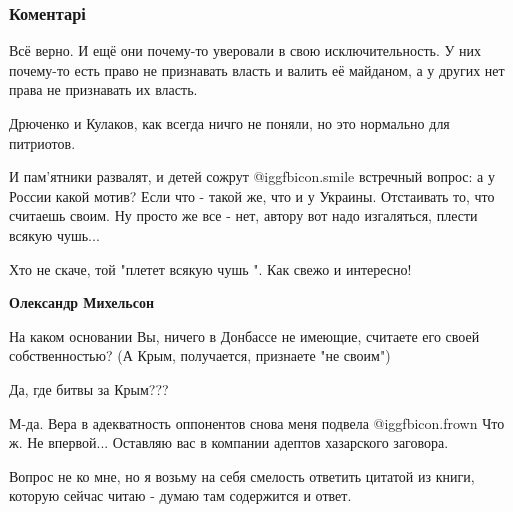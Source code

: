  
 
 
 
 
\subsubsection{Коментарі}
\label{sec:04_11_2021.fb.belenjkij_vjacheslav.1.patriotizm_vojna_donbass.cmt}

\begin{itemize} %

Всё верно. И ещё они почему-то уверовали в свою исключительность. У них
почему-то есть право не признавать власть и валить её майданом, а у других нет
права не признавать их власть.

Дрюченко и Кулаков, как всегда ничго не поняли, но это нормально для питриотов.


И пам'ятники развалят, и детей сожрут  @igg{fbicon.smile}  встречный вопрос: а у России какой
мотив? Если что - такой же, что и у Украины. Отстаивать то, что считаешь своим.
Ну просто же все - нет, автору вот надо изгаляться, плести всякую чушь...

\begin{itemize} %
Хто не скаче, той "плетет всякую чушь ".
Как свежо и интересно!

\textbf{Олександр Михельсон}

На каком основании Вы, ничего в Донбассе не имеющие, считаете его своей собственностью?
(А Крым, получается, признаете "не своим")

Да, где битвы за Крым???


М-да. Вера в адекватность оппонентов снова меня подвела  @igg{fbicon.frown}
Что ж. Не впервой... Оставляю вас в компании адептов хазарского заговора.
\end{itemize} %


Вопрос не ко мне, но я возьму на себя смелость ответить цитатой из книги,
которую сейчас читаю - думаю там содержится и ответ.


\end{itemize}
